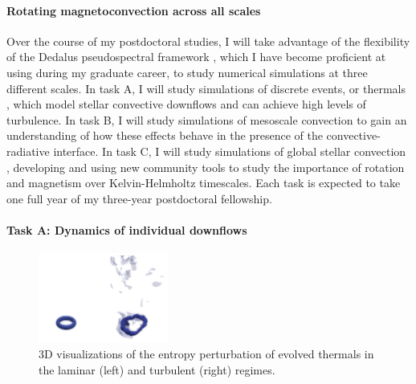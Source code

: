 \documentclass[11pt, preprint]{aastex}
\begin{document}
\paragraph{Rotating magnetoconvection across all scales}
Over the course of my postdoctoral studies, I will take advantage of the flexibility of the Dedalus pseudospectral framework \citep{burns&all2019}, which I have become proficient at using during my graduate career, to study numerical simulations at three different scales.
In task A, I will study simulations of discrete events, or thermals \citep[as in][]{andersLB2019}, which model stellar convective downflows and can achieve high levels of turbulence.
In task B, I will study simulations of mesoscale convection \citep[as in][]{anders&brown2017} to gain an understanding of how these effects behave in the presence of the convective-radiative interface.
In task C, I will study simulations of global stellar convection \citep[as in][]{lecoanet&all2018}, developing and using new community tools to study the importance of rotation and magnetism over Kelvin-Helmholtz timescales.
Each task is expected to take one full year of my three-year postdoctoral fellowship.

\paragraph{Task A: Dynamics of individual downflows}
\label{sct:taskA}
\begin{figure}
	\begin{center}
	\vspace{-10pt}
    \includegraphics[width=0.38\textwidth]{./figs/thermals_comparison.png}
	\vspace{-15pt}
	\end{center}
    \caption{
	3D visualizations of the entropy perturbation of evolved thermals in the laminar (left) and turbulent (right) regimes.
	\label{fig:thermals_comparison} }
\end{figure}
\end{document}
